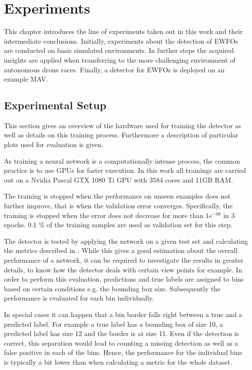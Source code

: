 \chapter{Experiments}
\label{sec:experiments}


This chapter introduces the line of experiments taken out in this work and their intermediate conclusions. Initially, experiments about the detection of \acp{EWFO} are conducted on basic simulated environments. In further steps the acquired insights are applied when transferring to the more challenging environment of autonomous drone races. Finally, a detector for \acp{EWFO} is deployed on an example \ac{MAV}.


\section{Experimental Setup}

This section gives an overview of the hardware used for training the detector as well as details on this training process. Furthermore a description of particular plots used for evaluation is given.

As training a neural network is a computationally intense process, the common practice is to use \acp{GPU} for faster execution. In this work all trainings are carried out on a Nvidia Pascal GTX 1080 Ti GPU with 3584 cores and 11GB RAM.

The training is stopped when the performance on unseen examples does not further improve, that is when the validation error converges. Specifically, the training is stopped when the error does not decrease for more than $1e^{-08}$ in 3 epochs. 0.1 \% of the training samples are used as validation set for this step.

The detector is tested by applying the network on a given test set and calculating the metrics described in . While this gives a good estimation about the overall performance of a network, it can be required to investigate the results in greater details, to know how the detector deals with certain view points for example. In order to perform this evaluation, predictions and true labels are assigned to bins based on certain conditions e.g. the bounding box size. Subsequently the performance is evaluated for each bin individually.

In special cases it can happen that a bin border falls right between a true and a predicted label. For example a true label has a bounding box of size 10, a predicted label has size 12 and the border is at size 11. Even if the detection is correct, this separation would lead to counting a missing detection as well as a false positive in each of the bins. Hence, the performance for the individual bins is typically a bit lower than when calculating a metric for the whole dataset.

